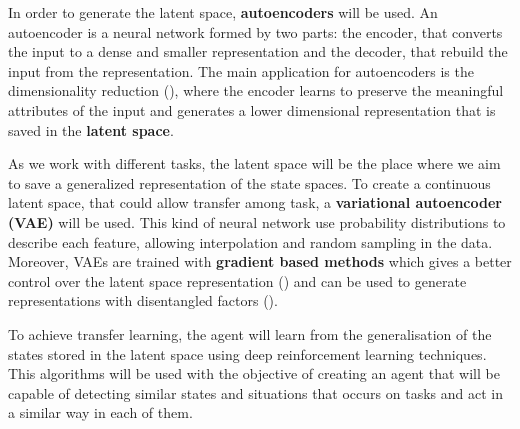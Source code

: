 \documentclass{article}
\begin{document}



In order to generate the latent space, \textbf{autoencoders} will be used. An autoencoder is a neural network formed by two parts: the encoder, that converts the input to a dense and smaller representation and the decoder, that rebuild the input from the representation. The main application for autoencoders is the dimensionality reduction (\cite{Hinton504}), where the encoder learns to preserve the meaningful attributes of the input and generates a lower dimensional representation that is saved in the \textbf{latent space}. 

As we work with different tasks, the latent space will be the place where we aim to save a generalized representation of the state spaces. To create a continuous latent space, that could allow transfer among task, a \textbf{variational autoencoder (VAE)} will be used. This kind of neural network use probability distributions to describe each feature, allowing interpolation and random sampling in the data. Moreover, VAEs are trained with \textbf{gradient based methods} which gives a better control over the latent space representation (\cite{goodfellow2016deep}) and can be used to generate representations with disentangled factors (\cite{2016arXiv160605579H}).

To achieve transfer learning, the agent will learn from the generalisation of the states stored in the latent space using deep reinforcement learning techniques. This algorithms will be used with the objective of creating an agent that will be capable of detecting similar states and situations that occurs on tasks and act in a similar way in each of them. 




\end{document}
